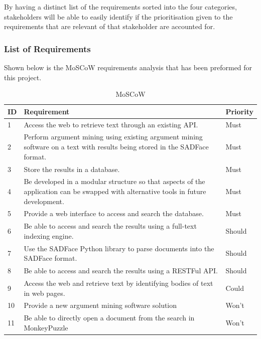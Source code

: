 \documentclass[12pt,a4paper]{article}
\begin{document}
By having a distinct list of the requirements sorted into the four categories, stakeholders will be able to easily identify if the prioritisation given to the requirements that are relevant of that stakeholder are accounted for.

\subsubsection{List of Requirements}

Shown below is the MoSCoW requirements analysis that has been preformed for this project.

\begin{table}[htbp]
    \centering
    \begin{tabular}{|p{1cm}|p{8cm}|p{2cm}|}
    \hline
    ID & Requirement & Priority\\
    \hline
    1 & Access the web to retrieve text through an existing API. & Must\\
    \hline
    2 & Perform argument mining using existing argument mining software on a text with results being stored in the SADFace format. & Must\\
    \hline
    3 & Store the results in a database. & Must\\
    \hline
    4 & Be developed in a modular structure so that aspects of the application can be swapped with alternative tools in future development. & Must\\
    \hline
    5 & Provide a web interface to access and search the database. & Must\\
    \hline
    6 & Be able to access and search the results using a full-text indexing engine. & Should\\
    \hline
    7 & Use the SADFace Python library to parse documents into the SADFace format. & Should\\
    \hline
    8 & Be able to access and search the results using a RESTFul API. & Should\\
    \hline
    9 & Access the web and retrieve text by identifying bodies of text in web pages. & Could\\
    \hline
    10 & Provide a new argument mining software solution & Won't\\
    \hline
    11 & Be able to directly open a document from the search in MonkeyPuzzle & Won't\\
    \hline
    \end{tabular}
    \caption{MoSCoW}
    \label{table:1}
\end{table}
\end{document}
